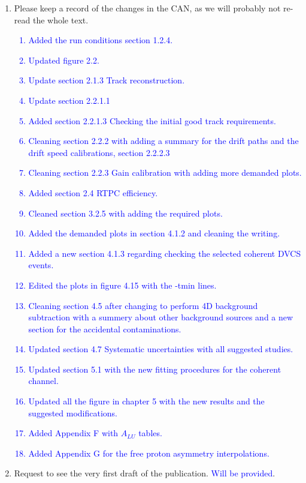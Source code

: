 \begin{enumerate}
\begin{enumerate}
   \end{enumerate}

\item Please keep a record of the changes in the CAN, as we will probably not 
   re-read the whole text.\\
\textcolor{blue}{\begin{enumerate}
      \item Added the run conditions section 1.2.4.
      \item Updated figure 2.2.
      \item Update section 2.1.3 Track reconstruction.
      \item Update section 2.2.1.1
      \item Added section 2.2.1.3 Checking the initial good track requirements.
      \item Cleaning section 2.2.2 with adding a summary for the drift paths 
         and the drift speed calibrations, section 2.2.2.3
      \item Cleaning section 2.2.3 Gain calibration with adding more demanded 
         plots.
      \item Added section 2.4 RTPC efficiency.
      \item Cleaned section 3.2.5 with adding the required plots.
      \item Added the demanded plots in section 4.1.2 and cleaning the writing.
      \item Added a new section 4.1.3 regarding checking the selected coherent 
         DVCS events.
      \item Edited the plots in figure 4.15 with the -tmin lines.
      \item Cleaning section 4.5 after changing to perform 4D background 
         subtraction with a summery about other background sources and a new 
         section for the accidental contaminations.
      \item Updated section 4.7 Systematic uncertainties with all suggested 
         studies.
      \item Updated section 5.1 with the new fitting procedures for the 
         coherent channel.
      \item Updated all the figure in chapter 5 with the new results and the 
         suggested modifications.
      \item Added Appendix F with $A_{LU}$ tables.
      \item Added Appendix G for the free proton asymmetry interpolations.
   \end{enumerate} }

\item Request to see the very first draft of the publication.
    \textcolor{blue}{Will be provided}.

\end{enumerate}
